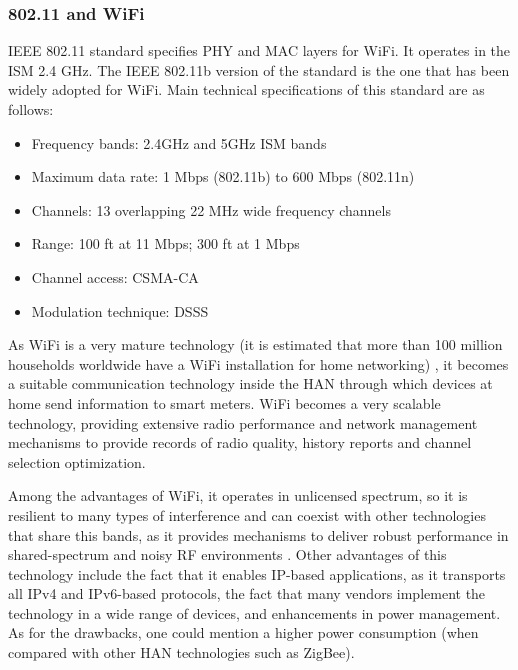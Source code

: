 \documentclass[11pt,draftclsnofoot,onecolumn]{IEEEtran}
\begin{document}
 
%

\subsubsection{802.11 and WiFi}\label{tech::wifi}

IEEE 802.11 standard \cite{Cali80211} specifies PHY and MAC layers for WiFi. It operates in the ISM 2.4 GHz. The IEEE 802.11b version of the standard is the one that has been widely adopted for WiFi. Main technical specifications of this standard are as follows:

\begin{itemize}
	\item Frequency bands: 2.4GHz and 5GHz ISM bands
	\item Maximum data rate: 1 Mbps (802.11b) to 600 Mbps (802.11n)
	\item Channels: 13 overlapping 22 MHz wide frequency channels
	\item Range: 100 ft at 11 Mbps; 300 ft at 1 Mbps
	\item Channel access: CSMA-CA
	\item Modulation technique: DSSS
\end{itemize}  

As WiFi is a very mature technology (it is estimated that more than 100 million households worldwide have a WiFi installation for home networking) \cite{WiFi2010}, it becomes a suitable communication technology inside the HAN through which devices at home send information to smart meters. WiFi becomes a very scalable technology, providing extensive radio performance and network management mechanisms to provide records of radio quality, history reports and channel selection optimization. %

Among the advantages of WiFi, it operates in unlicensed spectrum, so it is resilient to many types of interference and can coexist with other technologies that share this bands, as it provides mechanisms to deliver robust performance in shared-spectrum and noisy RF environments  \cite{WiFi2010}. Other advantages of this technology include the fact that it enables IP-based applications, as it transports all IPv4 and IPv6-based protocols, the fact that many vendors implement the technology in a wide range of devices, and enhancements in power management. As for the drawbacks, one could mention a higher power consumption (when compared with other HAN technologies such as ZigBee).  
\end{document}
